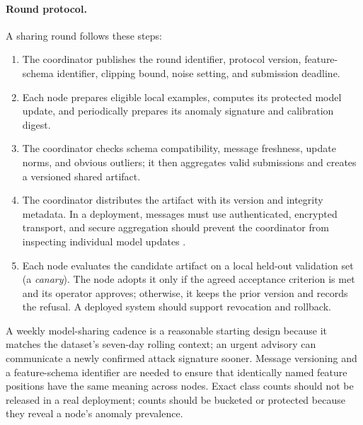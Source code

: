 \paragraph{Round protocol.} A sharing round follows these steps:
\begin{enumerate}
  \item The coordinator publishes the round identifier, protocol version, feature-schema identifier, clipping bound, noise setting, and submission deadline.
  \item Each node prepares eligible local examples, computes its protected model update, and periodically prepares its anomaly signature and calibration digest.
  \item The coordinator checks schema compatibility, message freshness, update norms, and obvious outliers; it then aggregates valid submissions and creates a versioned shared artifact.
  \item The coordinator distributes the artifact with its version and integrity metadata. In a deployment, messages must use authenticated, encrypted transport, and secure aggregation should prevent the coordinator from inspecting individual model updates \cite{bonawitz2017}.
  \item Each node evaluates the candidate artifact on a local held-out validation set (a \emph{canary}). The node adopts it only if the agreed acceptance criterion is met and its operator approves; otherwise, it keeps the prior version and records the refusal. A deployed system should support revocation and rollback.
\end{enumerate}

A weekly model-sharing cadence is a reasonable starting design because it matches the dataset's seven-day rolling context; an urgent advisory can communicate a newly confirmed attack signature sooner. Message versioning and a feature-schema identifier are needed to ensure that identically named feature positions have the same meaning across nodes. Exact class counts should not be released in a real deployment; counts should be bucketed or protected because they reveal a node's anomaly prevalence.

